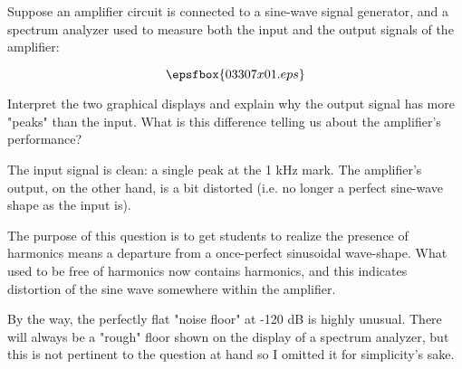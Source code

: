 

Suppose an amplifier circuit is connected to a sine-wave signal generator, and a spectrum analyzer used to measure both the input and the output signals of the amplifier:

$$\epsfbox{03307x01.eps}$$

Interpret the two graphical displays and explain why the output signal has more "peaks" than the input.  What is this difference telling us about the amplifier's performance?







The input signal is clean: a single peak at the 1 kHz mark.  The amplifier's output, on the other hand, is a bit distorted (i.e. no longer a perfect sine-wave shape as the input is).







The purpose of this question is to get students to realize the presence of harmonics means a departure from a once-perfect sinusoidal wave-shape.  What used to be free of harmonics now contains harmonics, and this indicates distortion of the sine wave somewhere within the amplifier.

By the way, the perfectly flat "noise floor" at -120 dB is highly unusual.  There will always be a "rough" floor shown on the display of a spectrum analyzer, but this is not pertinent to the question at hand so I omitted it for simplicity's sake.




